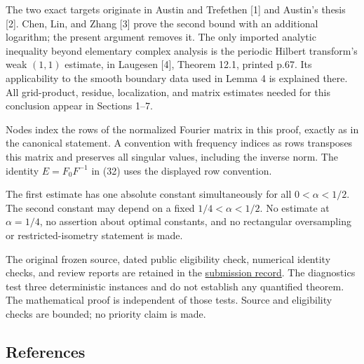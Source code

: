 \documentclass[10pt,a4paper]{article}
\begin{document}
The two exact targets originate in Austin and Trefethen {[}1{]} and
Austin's thesis {[}2{]}. Chen, Lin, and Zhang {[}3{]} prove the second
bound with an additional logarithm; the present argument removes it. The
only imported analytic inequality beyond elementary complex analysis is
the periodic Hilbert transform's weak \((1,1)\) estimate, in Laugesen
{[}4{]}, Theorem 12.1, printed p.67. Its applicability to the smooth
boundary data used in Lemma 4 is explained there. All grid-product,
residue, localization, and matrix estimates needed for this conclusion
appear in Sections 1--7.

Nodes index the rows of the normalized Fourier matrix in this proof,
exactly as in the canonical statement. A convention with frequency
indices as rows transposes this matrix and preserves all singular
values, including the inverse norm. The identity \(E=F_0F^{-1}\) in (32)
uses the displayed row convention.

The first estimate has one absolute constant simultaneously for all
\(0<\alpha<1/2\). The second constant may depend on a fixed
\(1/4<\alpha<1/2\). No estimate at \(\alpha=1/4\), no assertion about
optimal constants, and no rectangular oversampling or
restricted-isometry statement is made.

The original frozen source, dated public eligibility check, numerical
identity checks, and review reports are retained in the
\href{https://github.com/ajt60gaibb/OpenProblemsInNLA/blob/main/references/stepaniants-ie26-2026-09-12/README.md}{submission
record}. The diagnostics test three deterministic instances and do not
establish any quantified theorem. The mathematical proof is independent
of those tests. Source and eligibility checks are bounded; no priority
claim is made.

\subsection{References}\label{references}
\end{document}
